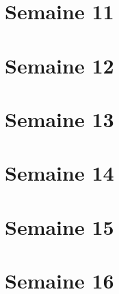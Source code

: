 \documentclass{article}
\begin{document}

\section{Semaine 11} 
\label{sec:S11}


\section{Semaine 12} 
\label{sec:S12}


\section{Semaine 13} 
\label{sec:S13}


\section{Semaine 14} 
\label{sec:S14}


\section{Semaine 15} 
\label{sec:S15}


\section{Semaine 16} 
\label{sec:S16}
\end{document}

